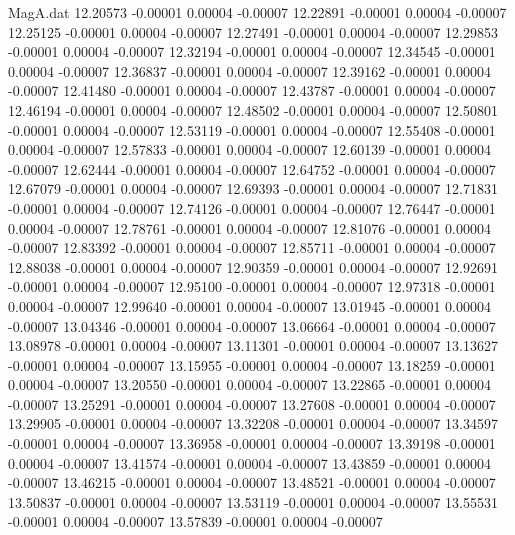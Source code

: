 \begin{filecontents}{MagA.dat}
  12.20573   -0.00001    0.00004   -0.00007
  12.22891   -0.00001    0.00004   -0.00007
  12.25125   -0.00001    0.00004   -0.00007
  12.27491   -0.00001    0.00004   -0.00007
  12.29853   -0.00001    0.00004   -0.00007
  12.32194   -0.00001    0.00004   -0.00007
  12.34545   -0.00001    0.00004   -0.00007
  12.36837   -0.00001    0.00004   -0.00007
  12.39162   -0.00001    0.00004   -0.00007
  12.41480   -0.00001    0.00004   -0.00007
  12.43787   -0.00001    0.00004   -0.00007
  12.46194   -0.00001    0.00004   -0.00007
  12.48502   -0.00001    0.00004   -0.00007
  12.50801   -0.00001    0.00004   -0.00007
  12.53119   -0.00001    0.00004   -0.00007
  12.55408   -0.00001    0.00004   -0.00007
  12.57833   -0.00001    0.00004   -0.00007
  12.60139   -0.00001    0.00004   -0.00007
  12.62444   -0.00001    0.00004   -0.00007
  12.64752   -0.00001    0.00004   -0.00007
  12.67079   -0.00001    0.00004   -0.00007
  12.69393   -0.00001    0.00004   -0.00007
  12.71831   -0.00001    0.00004   -0.00007
  12.74126   -0.00001    0.00004   -0.00007
  12.76447   -0.00001    0.00004   -0.00007
  12.78761   -0.00001    0.00004   -0.00007
  12.81076   -0.00001    0.00004   -0.00007
  12.83392   -0.00001    0.00004   -0.00007
  12.85711   -0.00001    0.00004   -0.00007
  12.88038   -0.00001    0.00004   -0.00007
  12.90359   -0.00001    0.00004   -0.00007
  12.92691   -0.00001    0.00004   -0.00007
  12.95100   -0.00001    0.00004   -0.00007
  12.97318   -0.00001    0.00004   -0.00007
  12.99640   -0.00001    0.00004   -0.00007
  13.01945   -0.00001    0.00004   -0.00007
  13.04346   -0.00001    0.00004   -0.00007
  13.06664   -0.00001    0.00004   -0.00007
  13.08978   -0.00001    0.00004   -0.00007
  13.11301   -0.00001    0.00004   -0.00007
  13.13627   -0.00001    0.00004   -0.00007
  13.15955   -0.00001    0.00004   -0.00007
  13.18259   -0.00001    0.00004   -0.00007
  13.20550   -0.00001    0.00004   -0.00007
  13.22865   -0.00001    0.00004   -0.00007
  13.25291   -0.00001    0.00004   -0.00007
  13.27608   -0.00001    0.00004   -0.00007
  13.29905   -0.00001    0.00004   -0.00007
  13.32208   -0.00001    0.00004   -0.00007
  13.34597   -0.00001    0.00004   -0.00007
  13.36958   -0.00001    0.00004   -0.00007
  13.39198   -0.00001    0.00004   -0.00007
  13.41574   -0.00001    0.00004   -0.00007
  13.43859   -0.00001    0.00004   -0.00007
  13.46215   -0.00001    0.00004   -0.00007
  13.48521   -0.00001    0.00004   -0.00007
  13.50837   -0.00001    0.00004   -0.00007
  13.53119   -0.00001    0.00004   -0.00007
  13.55531   -0.00001    0.00004   -0.00007
  13.57839   -0.00001    0.00004   -0.00007

\end{filecontents}
